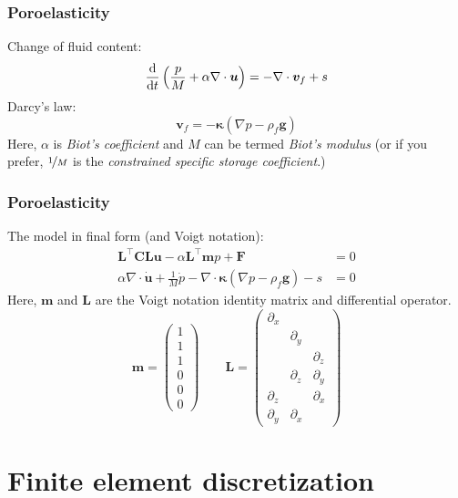 \documentclass{beamer}
\begin{document}
\begin{frame}
  \frametitle{Poroelasticity}

  Change of fluid content:
  \[
    \frac{\text{d}}{\text{d} t}\left( \frac{p}{M} + \alpha \nabla \cdot \bm{u} \right) =
    - \nabla \cdot \bm{v}_f + s
  \]
  Darcy's law:
  \[
    \bm{v}_f = -\bm{\kappa}(\nabla p - \rho_f \bm{g})
  \]
  Here, $\alpha$ is \emph{Biot's coefficient} and $M$ can be termed \emph{Biot's
  modulus} (or if you prefer, $\nicefrac{1}{M}$ is the
  \emph{constrained specific storage coefficient}.)
\end{frame}

\begin{frame}
  \frametitle{Poroelasticity}

  The model in final form (and Voigt notation):
  \begin{align*}
    \bm{L}^\intercal \bm{CLu} - \alpha \bm{L}^\intercal \bm{m} p + \bm{F} &= 0 \\
    \alpha \nabla \cdot \dot{\bm{u}} + \frac{1}{M}\dot{p}
    - \nabla \cdot \bm{\kappa}(\nabla p - \rho_f\bm{g}) - s &= 0
  \end{align*}
  Here, $\bm{m}$ and $\bm{L}$ are the Voigt notation identity matrix and
  differential operator.
  \[
    \bm{m} = \begin{pmatrix} 1 \\ 1 \\ 1 \\ 0 \\ 0 \\ 0 \end{pmatrix} \qquad
    \bm{L} = \begin{pmatrix}
      \partial_x & & \\
      & \partial_y & \\
      & & \partial_z \\
      & \partial_z & \partial_y \\
      \partial_z & & \partial_x \\
      \partial_y & \partial_x &
    \end{pmatrix}
  \]
\end{frame}

\section{Finite element discretization}
\end{document}
